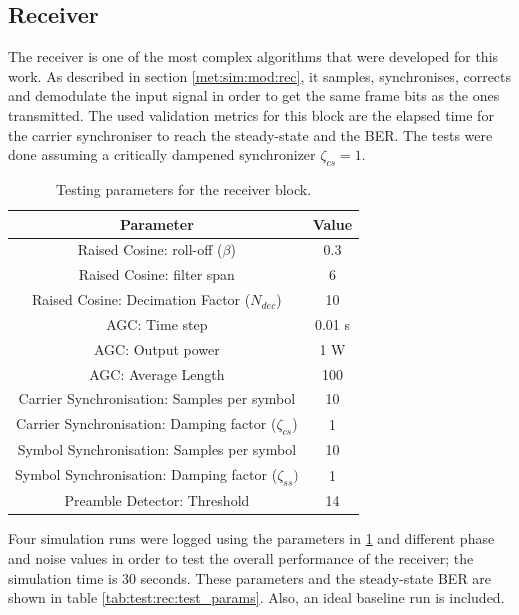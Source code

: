 \documentclass[12pt,a4paper]{report}
\begin{document}
\subsection{Receiver} \label{test:mod_rec:rec}
The receiver is one of the most complex algorithms that were developed for this work. As described in section \ref{met:sim:mod:rec}, it samples, synchronises, corrects and demodulate the input signal in order to get the same frame bits as the ones transmitted. The used validation metrics for this block are the elapsed time for the carrier synchroniser to reach the steady-state and the BER. The tests were done assuming a critically dampened synchronizer $\zeta_{cs} = 1$.

\begin{table}[!h]
    \centering
    \begin{tabular}{c|c}
        Parameter &  Value\\ \hline
        Raised Cosine: roll-off ($\beta$) & 0.3 \\
        Raised Cosine: filter span & 6 \\
        Raised Cosine: Decimation Factor ($N_{dec}$) & 10 \\
        \hline
        AGC: Time step & 0.01 s\\
        AGC: Output power & 1 W \\
        AGC: Average Length & 100 \\
        \hline
        Carrier Synchronisation: Samples per symbol & 10 \\
        Carrier Synchronisation: Damping factor ($\zeta_{cs}$)& 1 \\
        \hline
        Symbol Synchronisation: Samples per symbol & 10 \\
        Symbol Synchronisation: Damping factor ($\zeta_{ss})$ & 1 \\
        \hline
        Preamble Detector: Threshold & 14 \\
    \end{tabular}
    \caption{Testing parameters for the receiver block.}
    \label{tab:parameters:receiver}
\end{table}

Four simulation runs were logged using the parameters in \ref{tab:parameters:receiver} and different phase and noise values in order to test the overall performance of the receiver; the simulation time is 30 seconds. These parameters and the steady-state BER are shown in table \ref{tab:test:rec:test_params}. Also, an ideal baseline run is included.
\end{document}
